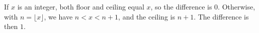 If $x$ is an integer, both floor and ceiling equal $x$, so the difference is $0$. Otherwise, with $n=\lfloor x\rfloor$, we have $n<x<n+1$, and the ceiling is $n+1$. The difference is then $1$.
